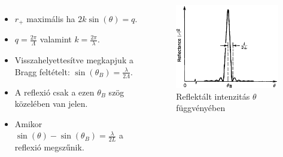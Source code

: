 \documentclass[aspectratio=169]{beamer}
\begin{document}
\begin{frame}
\begin{columns}
\begin{itemize}
\item $r_+$ maximális ha $2k\sin(\theta)=q$.
\item $q=\frac{2\pi}{\Lambda}$ valamint $k=\frac{2\pi}{\lambda}$.
\item Visszahelyettesítve megkapjuk a Bragg feltételt: $\sin(\theta_B)=\frac{\lambda}{2\Lambda}$.
\item A reflexió csak a ezen $\theta_B$ szög közelében van jelen.
\item Amikor $\sin(\theta)-\sin(\theta_B)=\frac{\lambda}{2L}$ a reflexió megszűnik.
\end{itemize}
\begin{figure}
\includegraphics[width=\textwidth]{sinc.png}
\caption{Reflektált intenzitás $\theta$ függvényében}
\end{figure}
\end{columns}
\end{frame}
\end{document}
